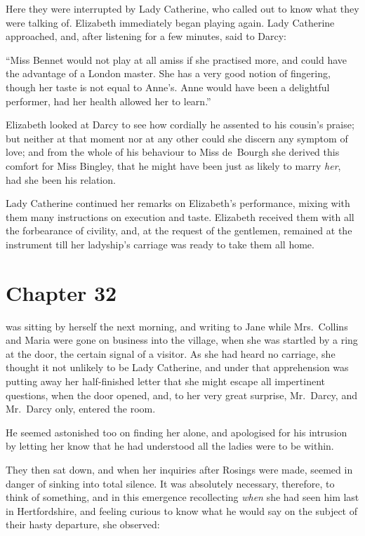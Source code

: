 Here they were interrupted by Lady Catherine, who called out to
know what they were talking of.  Elizabeth immediately began
playing again.  Lady Catherine approached, and, after listening
for a few minutes, said to Darcy:

``Miss Bennet would not play at all amiss if she practised more,
and could have the advantage of a London master.  She has a
very good notion of fingering, though her taste is not equal to
Anne's.  Anne would have been a delightful performer, had her
health allowed her to learn.''

Elizabeth looked at Darcy to see how cordially he assented to
his cousin's praise; but neither at that moment nor at any other
could she discern any symptom of love; and from the whole of
his behaviour to Miss de~Bourgh she derived this comfort for
Miss Bingley, that he might have been just as likely to marry
\emph{her}, had she been his relation.

Lady Catherine continued her remarks on Elizabeth's performance,
mixing with them many instructions on execution and taste.
Elizabeth received them with all the forbearance of civility,
and, at the request of the gentlemen, remained at the instrument
till her ladyship's carriage was ready to take them all home.



\chapter{Chapter 32}


 was sitting by herself the next morning, and writing to
Jane while Mrs.\ Collins and Maria were gone on business into
the village, when she was startled by a ring at the door, the
certain signal of a visitor.  As she had heard no carriage, she
thought it not unlikely to be Lady Catherine, and under that
apprehension was putting away her half-finished letter that she
might escape all impertinent questions, when the door opened,
and, to her very great surprise, Mr.\ Darcy, and Mr.\ Darcy only,
entered the room.

He seemed astonished too on finding her alone, and apologised
for his intrusion by letting her know that he had understood all
the ladies were to be within.

They then sat down, and when her inquiries after Rosings were
made, seemed in danger of sinking into total silence.  It was
absolutely necessary, therefore, to think of something, and in
this emergence recollecting \emph{when} she had seen him last in
Hertfordshire, and feeling curious to know what he would say
on the subject of their hasty departure, she observed:

